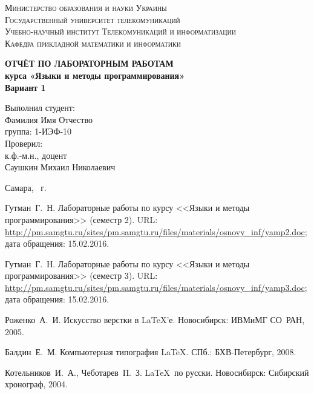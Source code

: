\documentclass[14pt,a4paper,report]{ncc}
\begin{document}
\renewcommand{\chaptername}{Лабораторная работа}
\def\contentsname{Содержание}

\begin{titlepage}
\begin{center}
\textsc{Министерство образования и науки Украины\\[2mm]
Государственный университет телекомуникаций\\[5mm]
Учебно-научный институт Телекомуникаций и информатизации\\[2mm]
Кафедра прикладной математики и информатики}

\vfill

\textbf{ОТЧЁТ ПО ЛАБОРАТОРНЫМ РАБОТАМ\\[3mm]
курса «Языки и методы программирования»\\[6mm]
Вариант 1
\\[20mm]
}
\end{center}

\hfill
\begin{minipage}{.5\textwidth}
Выполнил студент:\\[2mm] 
Фамилия Имя Отчество\\
группа: 1-ИЭФ-10\\[5mm]

Проверил:\\[2mm] 
к.ф.-м.н., доцент\\
Саушкин Михаил Николаевич
\end{minipage}%
\vfill
\begin{center}
 Самара, \theyear\ г.
\end{center}
\end{titlepage}

\tableofcontents
\newpage



\begin{thebibliography}{9}
Гутман~Г.~Н. Лабораторные работы по курсу <<Языки и методы программирования>> (семестр 2). URL: \url{http://pm.samgtu.ru/sites/pm.samgtu.ru/files/materials/osnovy_inf/yamp2.doc}; дата обращения: 15.02.2016.

Гутман~Г.~Н. Лабораторные работы по курсу <<Языки и методы программирования>> (семестр 3). URL: \url{http://pm.samgtu.ru/sites/pm.samgtu.ru/files/materials/osnovy_inf/yamp3.doc}; дата обращения: 15.02.2016.

Роженко~А.~И. Искусство верстки в \LaTeX'е.  Новосибирск: ИВМиМГ СО~РАН, 2005.

Балдин~Е.~М. Компьютерная типография \LaTeX.  СПб.: БХВ-Петербург, 2008.

Котельников~И.~А., Чеботарев~П.~З. \LaTeX\ по русски.
Новосибирск: Сибирский хронограф, 2004. 

\end{thebibliography}
\end{document}
